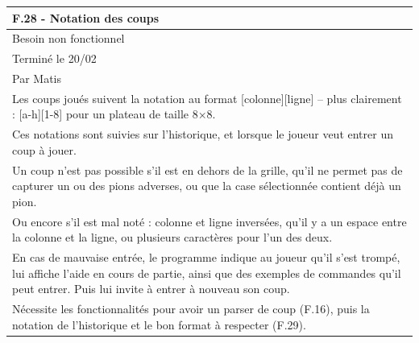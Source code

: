 \documentclass[a4paper,12pt]{article}
\begin{document}
\vspace{1cm}

\noindent
\setlength{\arrayrulewidth}{1.5pt}
\renewcommand{\arraystretch}{1.5}
\begin{tabularx}{\textwidth}{|X|}
    \hline
    \textbf{F.28 - Notation des coups}                                                                                                                                                                                       \\
    \hline
    Besoin non fonctionnel                                                                                                                                                                                                   \\
    \hline
    Terminé le 20/02                                                                                                                                                                                                         \\
    Par Matis                                                                                                                                                                                                                \\
    \hline
    Les coups joués suivent la notation au format [colonne][ligne] – plus clairement : [a-h][1-8] pour un plateau de taille 8×8.                                                                                             \\
    Ces notations sont suivies sur l’historique, et lorsque le joueur veut entrer un coup à jouer.                                                                                                                           \\
    Un coup n’est pas possible s’il est en dehors de la grille, qu’il ne permet pas de capturer un ou des pions adverses, ou que la case sélectionnée contient déjà un pion.                                                 \\
    Ou encore s’il est mal noté : colonne et ligne inversées, qu’il y a un espace entre la colonne et la ligne, ou plusieurs caractères pour l’un des deux.                                                                  \\
    En cas de mauvaise entrée, le programme indique au joueur qu’il s’est trompé, lui affiche l’aide en cours de partie, ainsi que des exemples de commandes qu’il peut entrer. Puis lui invite à entrer à nouveau son coup. \\
    \hline
    Nécessite les fonctionnalités pour avoir un parser de coup (F.16), puis la notation de l’historique et le bon format à respecter (F.29).                                                                                 \\
    \hline
\end{tabularx}
\end{document}
